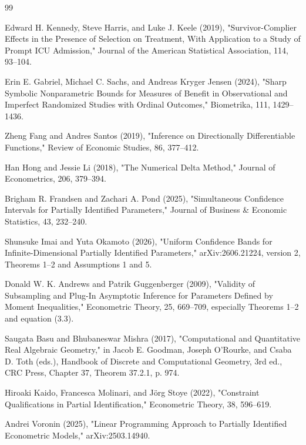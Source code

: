 \documentclass{article}
\begin{document}
\begin{thebibliography}{99}

   Edward H. Kennedy, Steve Harris, and Luke J. Keele (2019), "Survivor-Complier Effects in the Presence of Selection on Treatment, With Application to a Study of Prompt ICU Admission," Journal of the American Statistical Association, 114, 93--104.

   Erin E. Gabriel, Michael C. Sachs, and Andreas Kryger Jensen (2024), "Sharp Symbolic Nonparametric Bounds for Measures of Benefit in Observational and Imperfect Randomized Studies with Ordinal Outcomes," Biometrika, 111, 1429--1436.

   Zheng Fang and Andres Santos (2019), "Inference on Directionally Differentiable Functions," Review of Economic Studies, 86, 377--412.

   Han Hong and Jessie Li (2018), "The Numerical Delta Method," Journal of Econometrics, 206, 379--394.

   Brigham R. Frandsen and Zachari A. Pond (2025), "Simultaneous Confidence Intervals for Partially Identified Parameters," Journal of Business \& Economic Statistics, 43, 232--240.

   Shunsuke Imai and Yuta Okamoto (2026), "Uniform Confidence Bands for Infinite-Dimensional Partially Identified Parameters," arXiv:2606.21224, version 2, Theorems 1--2 and Assumptions 1 and 5.

   Donald W. K. Andrews and Patrik Guggenberger (2009), "Validity of Subsampling and Plug-In Asymptotic Inference for Parameters Defined by Moment Inequalities," Econometric Theory, 25, 669--709, especially Theorems 1--2 and equation (3.3).

   Saugata Basu and Bhubaneswar Mishra (2017), "Computational and Quantitative Real Algebraic Geometry," in Jacob E. Goodman, Joseph O'Rourke, and Csaba D. Toth (eds.), Handbook of Discrete and Computational Geometry, 3rd ed., CRC Press, Chapter 37, Theorem 37.2.1, p. 974.

   Hiroaki Kaido, Francesca Molinari, and Jörg Stoye (2022), "Constraint Qualifications in Partial Identification," Econometric Theory, 38, 596--619.

   Andrei Voronin (2025), "Linear Programming Approach to Partially Identified Econometric Models," arXiv:2503.14940.


\end{thebibliography}
\end{document}
